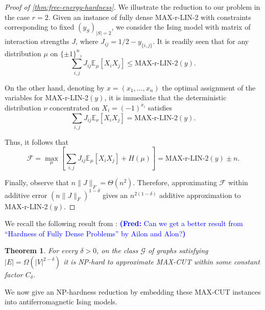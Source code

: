 \documentclass[final, 12pt]{colt2018}
\newcommand{\bE}{\mathbb{E}}
\newcommand{\F}{\mathcal{F}}
\newcommand{\E}{\bE}      %
\newcommand{\fnote}[1]{\textcolor{blue}{\small {\textbf{(Fred: }#1\textbf{) }}}}
\newtheorem{theorem}{Theorem}[section]
\theoremstyle{definition}
\theoremstyle{plain}
\begin{document}
\begin{proof}[Proof of \cref{thm:free-energy-hardness}]
We illustrate the reduction to our problem in the case $r = 2$. Given
an instance of fully dense MAX-r-LIN-2 with constraints corresponding
to fixed $(y_S)_{|S| = 2}$, we consider the Ising model with matrix of interaction strengths $J$, where 
$J_{ij} = 1/2 - y_{\{i,j\}}$. It is readily seen that for any distribution $\mu$ on $\{\pm 1\}^n$, 
$$\sum_{i,j} J_{ij} \E_{\mu}[X_i X_j] \leq \text{MAX-r-LIN-2}(y). $$ 

On the other hand, denoting by $x = (x_1,\dots, x_n)$ the optimal assignment of the variables for MAX-r-LIN-2$(y)$, it is immediate that the deterministic distribution $\nu$ concentrated on $X_i = (-1)^{x_i}$ satisfies  
$$\sum_{i,j} J_{ij} \E_{\nu}[X_i X_j] = \text{MAX-r-LIN-2}(y).$$

Thus, it follows that 
\[ \F = \max_{\mu}\left[\sum_{i,j} J_{ij} \E_{\mu}[X_i X_j] + H(\mu)\right] = \text{MAX-r-LIN-2}(y) \pm n. \]

Finally, observe that $n \|J\|_F = \Theta(n^2)$. Therefore, approximating $\F$ within
additive error $(n \|J\|_F)^{1 - \delta}$ gives an $n^{2(1 - \delta)}$ additive approximation to MAX-r-LIN-2$(y)$.
\end{proof}
\iffalse 
We recall the following result from \citep{dense-maxcut-hardness}:
\fnote{Can we get a better result from ``Hardness of Fully Dense Problems'' by Ailon and Alon?}
\begin{theorem}\label{thm:dense-maxcut-hardness}
For every $\delta > 0$, on the class $\mathcal{G}$ of graphs satisfying
$|E| = \Omega(|V|^{2 - \delta})$ it is NP-hard to approximate MAX-CUT within some
constant factor $C_{\delta}$.
\end{theorem}
We now give an NP-hardness reduction by embedding these MAX-CUT instances
into antiferromagnetic Ising models.
\end{document}
